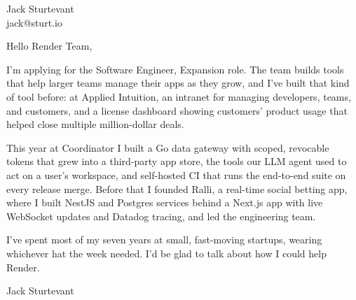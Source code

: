 \documentclass[11pt]{article}
\begin{document}
\raggedright

{\namefont\fontsize{20pt}{24pt}\selectfont Jack Sturtevant}\\[-0.3em]
jack@sturt.io

\vspace{1.2em}

Hello Render Team,

I'm applying for the Software Engineer, Expansion role. The team builds tools that help larger teams manage their apps as they grow, and I've built that kind of tool before: at Applied Intuition, an intranet for managing developers, teams, and customers, and a license dashboard showing customers' product usage that helped close multiple million-dollar deals.

This year at Coordinator I built a Go data gateway with scoped, revocable tokens that grew into a third-party app store, the tools our LLM agent used to act on a user's workspace, and self-hosted CI that runs the end-to-end suite on every release merge. Before that I founded Ralli, a real-time social betting app, where I built NestJS and Postgres services behind a Next.js app with live WebSocket updates and Datadog tracing, and led the engineering team.

I've spent most of my seven years at small, fast-moving startups, wearing whichever hat the week needed. I'd be glad to talk about how I could help Render.

\vspace{0.6em}
Jack Sturtevant
\end{document}
